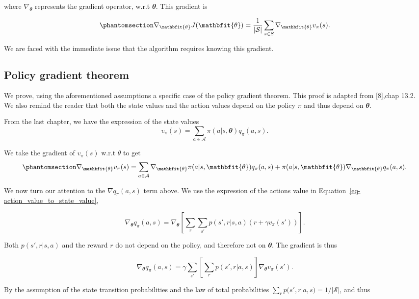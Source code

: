 \documentclass[
  letterpaper,
]{report}
\theoremstyle{definition}
\theoremstyle{plain}
\theoremstyle{definition}
\theoremstyle{remark}
\begin{document}
where \(\nabla_{\mathbfit{\theta}}\) represents the gradient operator,
w.r.t \(\mathbfit{\theta}\). This gradient is

\begin{equation}\phantomsection\label{eq-objective_gradient}{
\nabla_{\mathbfit{\theta}} J(\mathbfit{\theta}) = \frac{1}{|\mathcal{S}|}\sum_{s\in S}\nabla_{\mathbfit{\theta}}v_\pi(s).
}\end{equation}

We are faced with the immediate issue that the algorithm requires
knowing this gradient.

\subsection{Policy gradient theorem}\label{policy-gradient-theorem}

We prove, using the aforementioned assumptions a specific case of the
policy gradient theorem. This proof is adapted from {[}8{]},chap 13.2.
We also remind the reader that both the state values and the action
values depend on the policy \(\pi\) and thus depend on
\(\mathbfit{\theta}\).

From the last chapter, we have the expression of the state values \[
v_\pi(s) = \sum_{a\in\mathcal{A}}\pi(a|s, \mathbfit{\theta})q_\pi(a,s).
\]

We take the gradient of \(v_\pi(s)\) w.r.t \(\theta\) to get
\begin{equation}\phantomsection\label{eq-gradient_wrt_theta}{
\nabla_{\mathbfit{\theta}} v_\pi(s) = \sum_{a\in\mathcal{A}}\nabla_{\mathbfit{\theta}}\pi(a|s, {\mathbfit{\theta}})q_\pi(a,s) + \pi(a|s,{\mathbfit{\theta}})\nabla_{\mathbfit{\theta}} q_\pi(a,s).
}\end{equation}

We now turn our attention to the \(\nabla q_\pi(a,s)\) term above. We
use the expression of the actions value in
Equation~\ref{eq-action_value_to_state_value},

\[
\nabla_{\mathbfit{\theta}} q_\pi(a,s) = \nabla_{\mathbfit{\theta}} \left[ \sum_{r}\sum_{s'} p(s',r|s,a)(r + \gamma v_\pi(s'))\right].
\]

Both \(p(s',r|s,a)\) and the reward \(r\) do not depend on the policy,
and therefore not on \(\mathbfit{\theta}\). The gradient is thus

\[
\nabla_{\mathbfit{\theta}} q_\pi(a,s) =  \gamma\sum_{s'}\left[\sum_{r}p(s',r|a,s)\right]\nabla_{\mathbfit{\theta}} v_\pi(s').
\]

By the assumption of the state transition probabilities and the law of
total probabilities \(\sum_{r}p(s',r|a,s)= 1/|\mathcal{S}|\), and thus
\end{document}
